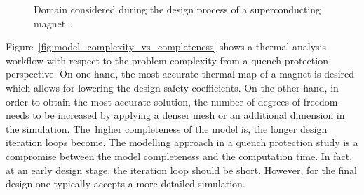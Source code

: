 \begin{figure}[H]
    \centering
    \caption{Domain considered during the design process of a superconducting magnet~\cite{quench_protection_system_applied_prioli}.}
    \label{fig:magnet_design_domains}
\end{figure}

Figure~\ref{fig:model_complexity_vs_completeness} shows a thermal analysis workflow with respect to the problem complexity from a quench protection perspective. On one hand, the most accurate thermal map of a magnet is desired which allows for lowering the design safety coefficients. On the other hand, in order to obtain the most accurate solution, the number of degrees of freedom needs to be increased by applying a denser mesh or an additional dimension in the simulation. The~higher completeness of the model is, the longer design iteration loops become. The modelling approach in a quench protection study is a compromise between the model completeness and the computation time. In fact, at an early design stage, the iteration loop should be short. However, for the final design one typically accepts a more detailed simulation. 

